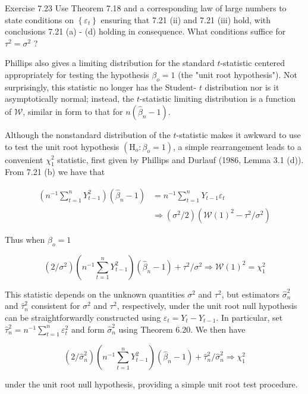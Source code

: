 \documentclass[10pt]{article}
\begin{document}
Exercise 7.23 Use Theorem 7.18 and a corresponding law of large numbers to state conditions on $\left\{\varepsilon_{t}\right\}$ ensuring that 7.21 (ii) and 7.21 (iii) hold, with conclusions 7.21 (a) - (d) holding in consequence. What conditions suffice for $\tau^{2}=\sigma^{2}$ ?

Phillips also gives a limiting distribution for the standard $t$-statistic centered appropriately for testing the hypothesis $\beta_{o}=1$ (the "unit root hypothesis"). Not surprisingly, this statistic no longer has the Student- $t$ distribution nor is it asymptotically normal; instead, the $t$-statistic limiting distribution is a function of $\mathcal{W}$, similar in form to that for $n\left(\hat{\beta}_{n}-1\right)$.

Although the nonstandard distribution of the $t$-statistic makes it awkward to use to test the unit root hypothesis $\left(\mathrm{H}_{o}: \beta_{o}=1\right)$, a simple rearrangement leads to a convenient $\chi_{1}^{2}$ statistic, first given by Phillips and Durlauf (1986, Lemma 3.1 (d)). From 7.21 (b) we have that

$$
\begin{aligned}
\left(n^{-1} \sum_{t=1}^{n} Y_{t-1}^{2}\right)\left(\hat{\beta}_{n}-1\right) & =n^{-1} \sum_{t=1}^{n} Y_{t-1} \varepsilon_{t} \\
& \Rightarrow\left(\sigma^{2} / 2\right)\left(\mathcal{W}(1)^{2}-\tau^{2} / \sigma^{2}\right)
\end{aligned}
$$

Thus when $\beta_{o}=1$

$$
\left(2 / \sigma^{2}\right)\left(n^{-1} \sum_{t=1}^{n} Y_{t-1}^{2}\right)\left(\hat{\beta}_{n}-1\right)+\tau^{2} / \sigma^{2} \Rightarrow \mathcal{W}(1)^{2}=\chi_{1}^{2}
$$

This statistic depends on the unknown quantities $\sigma^{2}$ and $\tau^{2}$, but estimators $\hat{\sigma}_{n}^{2}$ and $\hat{\tau}_{n}^{2}$ consistent for $\sigma^{2}$ and $\tau^{2}$, respectively, under the unit root null hypothesis can be straightforwardly constructed using $\varepsilon_{t}=Y_{t}-Y_{t-1}$. In particular, set $\hat{\tau}_{n}^{2}=n^{-1} \sum_{t=1}^{n} \varepsilon_{t}^{2}$ and form $\hat{\sigma}_{n}^{2}$ using Theorem 6.20. We then have

$$
\left(2 / \hat{\sigma}_{n}^{2}\right)\left(n^{-1} \sum_{t=1}^{n} Y_{t-1}^{2}\right)\left(\hat{\beta}_{n}-1\right)+\hat{\tau}_{n}^{2} / \hat{\sigma}_{n}^{2} \Rightarrow \chi_{1}^{2}
$$

under the unit root null hypothesis, providing a simple unit root test procedure.
\end{document}
